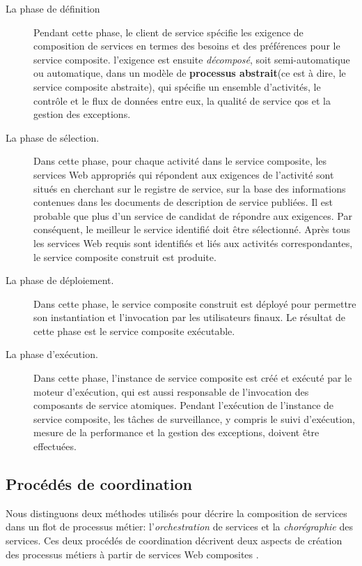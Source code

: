   \renewcommand{\descriptionlabel}[1]{\hspace{0.5cm}\textbullet~\textsf{#1}}
  \begin{description}
  \item[La phase de définition] Pendant cette phase, le client de
    service spécifie les exigence de composition de services en termes
    des besoins et des préférences pour le service
    composite. l'exigence est ensuite \textit{décomposé}, soit
    semi-automatique ou automatique, dans un modèle de
    \textbf{processus abstrait}(ce est à dire, le service composite
    abstraite), qui spécifie un ensemble d'activités, le contrôle et
    le flux de données entre eux, la qualité de service \acrshort{qos}
    et la gestion des exceptions.

  \item[La phase de sélection.] Dans cette phase, pour chaque activité
    dans le service composite, les services Web appropriés qui
    répondent aux exigences de l'activité sont situés en cherchant sur
    le registre de service, sur la base des informations contenues
    dans les documents de description de service publiées. Il est
    probable que plus d'un service de candidat de répondre aux
    exigences. Par conséquent, le meilleur le service identifié doit
    être sélectionné. Après tous les services Web requis sont
    identifiés et liés aux activités correspondantes, le service
    composite construit est produite.

  \item[La phase de déploiement.]Dans cette phase, le service
    composite construit est déployé pour permettre son instantiation
    et l'invocation par les utilisateurs finaux. Le résultat de cette
    phase est le service composite exécutable.

  \item[La phase d'exécution.] Dans cette phase, l'instance de service
    composite est créé et exécuté par le moteur d'exécution, qui est
    aussi responsable de l'invocation des composants de service
    atomiques. Pendant l'exécution de l'instance de service composite,
    les tâches de surveillance, y compris le suivi d'exécution, mesure
    de la performance et la gestion des exceptions, doivent être
    effectuées.
  \end{description}
  \enddescription

  \subsection{Procédés de coordination}
  \label{sec:proc-de-coord}
  Nous distinguons deux méthodes utilisés pour décrire la composition
  de services dans un flot de processus métier: l'\emph{orchestration}
  de services et la \emph{chorégraphie} des services. Ces deux
  procédés de coordination décrivent deux aspects de création des
  processus métiers à partir de services Web composites
  \cite{peltz2003web}.\medskip

